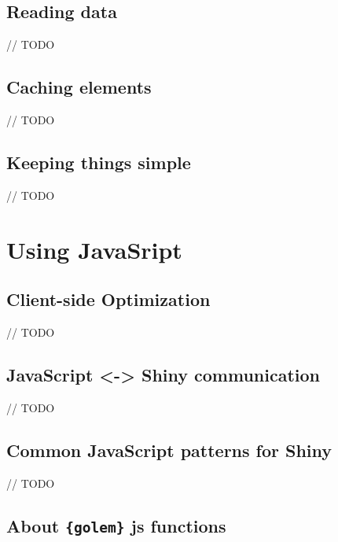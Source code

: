 \documentclass[]{book}
\begin{document}
\hypertarget{reading-data-1}{%
\section{Reading data}\label{reading-data-1}}

// TODO

\hypertarget{caching-elements}{%
\section{Caching elements}\label{caching-elements}}

// TODO

\hypertarget{keeping-things-simple}{%
\section{Keeping things simple}\label{keeping-things-simple}}

// TODO

\hypertarget{optimjs}{%
\chapter{Using JavaSript}\label{optimjs}}

\hypertarget{client-side-optimization}{%
\section{Client-side Optimization}\label{client-side-optimization}}

// TODO

\hypertarget{javascript---shiny-communication}{%
\section{JavaScript \textless{}-\textgreater{} Shiny communication}\label{javascript---shiny-communication}}

// TODO

\hypertarget{common-javascript-patterns-for-shiny}{%
\section{Common JavaScript patterns for Shiny}\label{common-javascript-patterns-for-shiny}}

// TODO

\hypertarget{about-golem-js-functions}{%
\section{\texorpdfstring{About \texttt{\{golem\}} js functions}{About \{golem\} js functions}}\label{about-golem-js-functions}}
\end{document}
